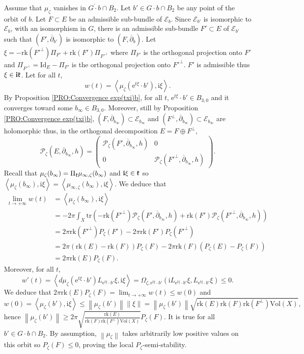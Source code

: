 \documentclass{article}
\theoremstyle{remark}
\theoremstyle{definition}
\newcommand{\rk}{\mathrm{rk}}
\newcommand{\tr}{\mathrm{tr}}
\newcommand{\Vol}{\mathrm{Vol}}
\newcommand{\Id}{\mathrm{Id}}
\renewcommand{\i}{\boldsymbol{\mathrm{i}}}
\newcommand{\e}{\boldsymbol{\mathrm{e}}}
\newcommand{\scal}[2]{\left< #1,#2 \right>}
\newcommand{\norme}[1]{\left\| #1 \right\|}
\newcommand{\E}{\mathcal{E}}
\newcommand{\mP}{\mathcal{P}}
\newcommand{\dbar}{\overline{\partial}}
\renewcommand{\leq}{\leqslant}
\renewcommand{\geq}{\geqslant}
\begin{document}
\noindent{} Assume that $\mu_\zeta$ vanishes in $\overline{G \cdot b} \cap B_2$. Let $b' \in G \cdot b \cap B_2$ be any point of the orbit of $b$. Let $F \subset E$ be an admissible sub-bundle of $\E_b$. Since $\E_{b'}$ is isomorphic to $\E_b$, with an isomorphism in $G$, there is an admissible sub-bundle $F' \subset E$ of $\E_{b'}$ such that $(F',\dbar_{b'})$ is isomorphic to $(F,\dbar_b)$. Let $\xi = -\rk({F'}^\bot)\Pi_{F'} + \rk(F')\Pi_{{F'}^\bot}$ where $\Pi_{F'}$ is the orthogonal projection onto $F'$ and $\Pi_{{F'}^\bot} = \Id_E - \Pi_{F'}$ is the orthogonal projection onto ${F'}^\bot$. $F'$ is admissible thus $\xi \in \i\frak{k}$. Let for all $t$,
$$
w(t) = \scal{\mu_\zeta(\e^{t\xi} \cdot b')}{\i\xi}.
$$
By Proposition \ref{PRO:Convergence exp(txi)b}, for all $t$, $\e^{t\xi} \cdot b' \in B_{3,0}$ and it converges toward some $b_\infty \in B_{3,0}$. Moreover, still by Proposition \ref{PRO:Convergence exp(txi)b}, $(F,\dbar_{b_\infty}) \subset \E_{b_\infty}$ and $(F^\bot,\dbar_{b_\infty}) \subset \E_{b_\infty}$ are holomorphic thus, in the orthogonal decomposition $E = F \oplus F^\bot$,
$$
\mP_\zeta(E,\dbar_{b_\infty},h) =
\begin{pmatrix}
    \mP_\zeta(F',\dbar_{b_\infty},h) & 0\\
    0 & \mP_\zeta({F'}^\bot,\dbar_{b_\infty},h)
\end{pmatrix}.
$$
Recall that $\mu_\zeta(b_\infty) = \Pi_{\frak{k}}\mu_{\infty,\zeta}(b_\infty)$ and $\i\xi \in \frak{k}$ so $\scal{\mu_\zeta(b_\infty)}{\i\xi} = \scal{\mu_{\infty,\zeta}(b_\infty)}{\i\xi}$. We deduce that
\begin{align*}
    \lim_{t \rightarrow +\infty} w(t) & = \scal{\mu_\zeta(b_\infty)}{\i\xi}\\
    & = -2\pi\int_X \tr(-\rk({F'}^\bot)\mP_\zeta(F',\dbar_{b_\infty},h) + \rk({F'})\mP_\zeta({F'}^\bot,\dbar_{b_\infty},h))\\
    & = 2\pi\rk({F'}^\bot)P_\zeta(F') - 2\pi\rk(F')P_\zeta({F'}^\bot)\\
    & = 2\pi(\rk(E) - \rk(F))P_\zeta(F) - 2\pi\rk(F)(P_\zeta(E) - P_\zeta(F))\\
    & = 2\pi\rk(E)P_\zeta(F).
\end{align*}
Moreover, for all $t$,
$$
w'(t) = \scal{d\mu_\zeta(\e^{t\xi} \cdot b')L_{\e^{t\xi} \cdot b'}\xi}{\i\xi} = \Omega_{\zeta,\e^{t\xi} \cdot b'}(\i L_{\e^{t\xi} \cdot b'}\xi,L_{\e^{t\xi} \cdot b'}\xi) \leq 0.
$$
We deduce that $2\pi\rk(E)P_\zeta(F) = \lim_{t \rightarrow +\infty} w(t) \leq w(0)$ and
$$
w(0) = \scal{\mu_\zeta(b')}{\i\xi} \leq \norme{\mu_\zeta(b')}\norme{\xi} = \norme{\mu_\zeta(b')}\sqrt{\rk(E)\rk(F)\rk(F^\bot)\Vol(X)},
$$
hence $\norme{\mu_\zeta(b')} \geq 2\pi\sqrt{\frac{\rk(E)}{\rk(F)\rk(F^\bot)\Vol(X)}}P_\zeta(F)$. It is true for all $b' \in G \cdot b \cap B_2$. By assumption, $\norme{\mu_\zeta}$ takes arbitrarily low positive values on this orbit so $P_\zeta(F) \leq 0$, proving the local $P_\zeta$-semi-stability.\\
\end{document}
